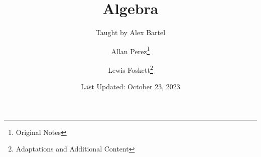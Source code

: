 \documentclass[11pt]{scrartcl}
\title{Algebra}
\subtitle{Taught by Alex Bartel}
\author{Allan Perez\thanks{Original Notes} \and Lewis Foskett\thanks{Adaptations and Additional Content}}
\date{Last Updated: October 23, 2023}
\begin{document}
 \maketitle
 

\tableofcontents
\newpage
\listoftheorems
\newpage

































\end{document}
